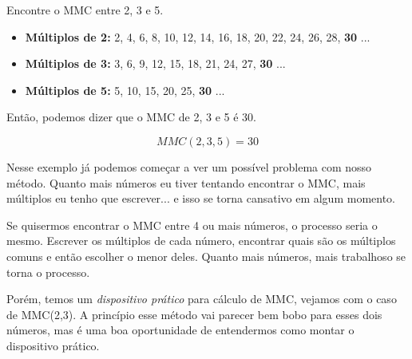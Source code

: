 \begin{exemplo}
    Encontre o MMC entre 2, 3 e 5.

    \begin{itemize}
        \item \textbf{Múltiplos de 2:} 2, 4, 6, 8, 10, 12, 14, 16, 18, 20, 22, 24, 26, 28, \textbf{30} ...
        \item \textbf{Múltiplos de 3:} 3, 6, 9, 12, 15, 18, 21, 24, 27, \textbf{30} ...
        \item \textbf{Múltiplos de 5:} 5, 10, 15, 20, 25, \textbf{30} ...
    \end{itemize}

    Então, podemos dizer que o MMC de 2, 3 e 5 é 30.

    \begin{equation}
        MMC(2,3,5)=30
    \end{equation}
    
    Nesse exemplo já podemos começar a ver um possível problema com nosso método. Quanto mais números eu tiver tentando encontrar o MMC, mais múltiplos eu tenho que escrever... e isso se torna cansativo em algum momento.
\end{exemplo}

Se quisermos encontrar o MMC entre 4 ou mais números, o processo seria o mesmo. Escrever os múltiplos de cada número, encontrar quais são os múltiplos comuns e então escolher o menor deles. Quanto mais números, mais trabalhoso se torna o processo. 

Porém, temos um \textit{dispositivo prático} para cálculo de MMC, vejamos com o caso de MMC(2,3). A princípio esse método vai parecer bem bobo para esses dois números, mas é uma boa oportunidade de entendermos como montar o dispositivo prático.

